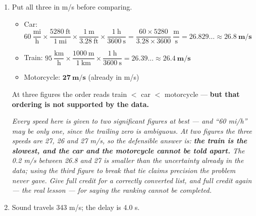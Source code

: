 \documentclass[12pt, twoside]{article}
\begin{document}
\begin{enumerate}[itemsep=0.2cm]
\begin{enumerate}[itemsep=0.2cm]
      $95~\dfrac{\text{mi}}{\text{h}} \times \dfrac{5280~\text{ft}}{1~\text{mi}}
      \times \dfrac{1~\text{m}}{3.28~\text{ft}} \times \dfrac{1~\text{h}}{3600~\text{s}}
      = \dfrac{95 \times 5280}{3.28 \times 3600}~\dfrac{\text{m}}{\text{s}}
      = 42.48\ldots \approx \mathbf{42.5~\textbf{m/s}}$

      \emph{Write the whole conversion as one product and evaluate once. If you continue
      from part (a) instead, carry the full 139.33 ft/s --- restarting from the rounded 139
      gives 42.4, wrong in the last figure. Rounding mid-chain is the commonest way to lose
      an accuracy mark.}
  \end{enumerate}

\item Put all three in m/s before comparing.
  \begin{itemize}[itemsep=0.25cm]
    \item Car: $60~\dfrac{\text{mi}}{\text{h}} \times \dfrac{5280~\text{ft}}{1~\text{mi}}
      \times \dfrac{1~\text{m}}{3.28~\text{ft}} \times \dfrac{1~\text{h}}{3600~\text{s}}
      = \dfrac{60 \times 5280}{3.28 \times 3600}~\dfrac{\text{m}}{\text{s}}
      = 26.829\ldots \approx \mathbf{26.8~\textbf{m/s}}$
    \item Train: $95~\dfrac{\text{km}}{\text{h}} \times \dfrac{1000~\text{m}}{1~\text{km}}
      \times \dfrac{1~\text{h}}{3600~\text{s}} = 26.39\ldots \approx \mathbf{26.4~\textbf{m/s}}$
    \item Motorcycle: $\mathbf{27~\textbf{m/s}}$ (already in m/s)
  \end{itemize}
  \vspace{0.15cm}
  At three figures the order reads train $<$ car $<$ motorcycle --- \textbf{but that
  ordering is not supported by the data.}

  \emph{Every speed here is given to two significant figures at best --- and ``60 mi/h''
  may be only one, since the trailing zero is ambiguous. At two figures the three speeds
  are 27, 26 and 27 m/s, so the defensible answer is: \textbf{the train is the slowest,
  and the car and the motorcycle cannot be told apart.} The 0.2 m/s between 26.8 and 27 is
  smaller than the uncertainty already in the data; using the third figure to break that
  tie claims precision the problem never gave. Give full credit for a correctly converted
  list, and full credit again --- the real lesson --- for saying the ranking cannot be
  completed.}

\item Sound travels 343 m/s; the delay is 4.0 s.


\end{enumerate}
\end{document}
